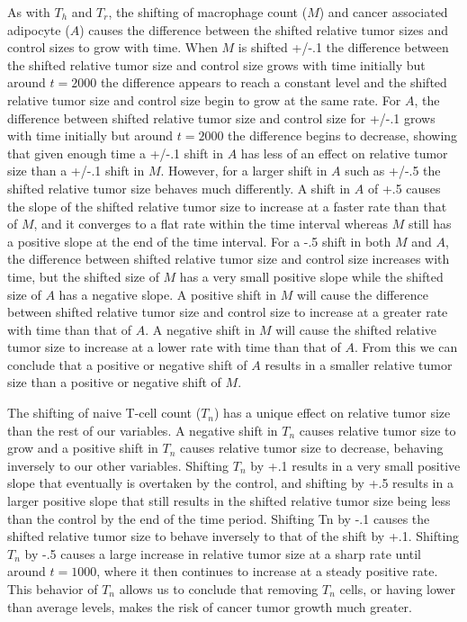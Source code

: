 \documentclass{article}
\begin{document}
As with $T_h$ and $T_r$, the shifting of macrophage count ($M$) and cancer associated adipocyte ($A$) causes the difference between the shifted relative tumor sizes and control sizes to grow with time. When $M$ is shifted +/-.1 the difference between the shifted relative tumor size and control size grows with time initially but around $t = 2000$ the difference appears to reach a constant level and the shifted relative tumor size and control size begin to grow at the same rate. For $A$, the difference between shifted relative tumor size and control size for +/-.1 grows with time initially but around $t = 2000$ the difference begins to decrease, showing that given enough time a +/-.1 shift in $A$ has less of an effect on relative tumor size than a +/-.1 shift in $M$. However, for a larger shift in $A$ such as +/-.5 the shifted relative tumor size behaves much differently. A shift in $A$ of +.5 causes the slope of the shifted relative tumor size to increase at a faster rate than that of $M$, and it converges to a flat rate within the time interval whereas $M$ still has a positive slope at the end of the time interval. For a -.5 shift in both $M$ and $A$, the difference between shifted relative tumor size and control size increases with time, but the shifted size of $M$ has a very small positive slope while the shifted size of $A$ has a negative slope. A positive shift in $M$ will cause the difference between shifted relative tumor size and control size to increase at a greater rate with time than that of $A$. A negative shift in $M$ will cause the shifted relative tumor size to increase at a lower rate with time than that of $A$. From this we can conclude that a positive or negative shift of $A$ results in a smaller relative tumor size than a positive or negative shift of $M$.

The shifting of naive T-cell count ($T_n$) has a unique effect on relative tumor size than the rest of our variables. A negative shift in $T_n$ causes relative tumor size to grow and a positive shift in $T_n$ causes relative tumor size to decrease, behaving inversely to our other variables. Shifting $T_n$ by +.1 results in a very small positive slope that eventually is overtaken by the control, and shifting by +.5 results in a larger positive slope that still results in the shifted relative tumor size being less than the control by the end of the time period. Shifting Tn by -.1 causes the shifted relative tumor size to behave inversely to that of the shift by +.1. Shifting $T_n$ by -.5 causes a large increase in relative tumor size at a sharp rate until around $t = 1000$, where it then continues to increase at a steady positive rate. This behavior of $T_n$ allows us to conclude that removing $T_n$ cells, or having lower than average levels, makes the risk of cancer tumor growth much greater. 
\end{document}
